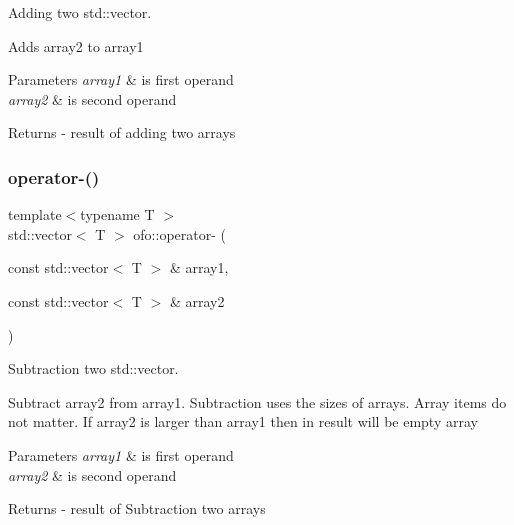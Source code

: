 Adding two std\+::vector. 

Adds \textquotesingle{}array2\textquotesingle{} to \textquotesingle{}array1\textquotesingle{} 
\begin{DoxyParams}{Parameters}
{\em array1} & is first operand \\
\hline
{\em array2} & is second operand \\
\hline
\end{DoxyParams}
\begin{DoxyReturn}{Returns}
-\/ result of adding two arrays 
\end{DoxyReturn}
\mbox{\label{namespaceofo_acb123ddb76ace937baf29a4b6f2fcd8a}} 
\subsubsection{\texorpdfstring{operator-\/()}{operator-()}\hspace{0.1cm}{\footnotesize\ttfamily [1/2]}}
{\footnotesize\ttfamily template$<$typename T $>$ \\
std\+::vector$<$ T $>$ ofo\+::operator-\/ (\begin{DoxyParamCaption}\item[{const std\+::vector$<$ T $>$ \&}]{array1,  }\item[{const std\+::vector$<$ T $>$ \&}]{array2 }\end{DoxyParamCaption})}



Subtraction two std\+::vector. 

Subtract \textquotesingle{}array2\textquotesingle{} from \textquotesingle{}array1\textquotesingle{}. Subtraction uses the sizes of arrays. Array items do not matter. If \textquotesingle{}array2\textquotesingle{} is larger than \textquotesingle{}array1\textquotesingle{} then in result will be empty array 
\begin{DoxyParams}{Parameters}
{\em array1} & is first operand \\
\hline
{\em array2} & is second operand \\
\hline
\end{DoxyParams}
\begin{DoxyReturn}{Returns}
-\/ result of Subtraction two arrays 
\end{DoxyReturn}
\mbox{\label{namespaceofo_ab410ed9a84e65ca88a937b56b8411a97}} 
